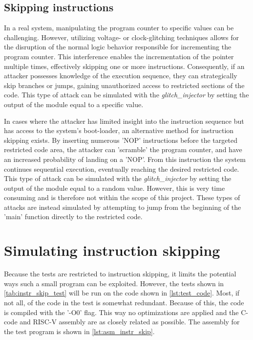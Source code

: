 \subsection{Skipping instructions}
\label{subsec:skip_instr}

In a real system, manipulating the program counter to specific values can be challenging. However, utilizing voltage- or clock-glitching techniques allows for the disruption of the normal logic behavior responsible for incrementing the program counter. This interference enables the incrementation of the pointer multiple times, effectively skipping one or more instructions. Consequently, if an attacker possesses knowledge of the execution sequence, they can strategically skip branches or jumps, gaining unauthorized access to restricted sections of the code. This type of attack can be simulated with the \textit{glitch\_injector} by setting the output of the module equal to a specific value. 

In cases where the attacker has limited insight into the instruction sequence but has access to the system's boot-loader, an alternative method for instruction skipping exists. By inserting numerous 'NOP' instructions before the targeted restricted code area, the attacker can 'scramble' the program counter, and have an increased probability of landing on a 'NOP'. From this instruction the system continues sequential execution, eventually reaching the desired restricted code. This type of attack can be simulated with the \textit{glitch\_injector} by setting the output of the module equal to a random value. However, this is very time consuming and is therefore not within the scope of this project. These types of attacks are instead simulated by attempting to jump from the beginning of the 'main' function directly to the restricted code. 

\section{Simulating instruction skipping}
\label{sec:sim_instr_skip}

Because the tests are restricted to instruction skipping, it limits the potential ways such a small program can be exploited. However, the tests shown in \autoref{tab:instr_skip_test} will be run on the code shown in \autoref{lst:test_code}. Most, if not all, of the code in the test is somewhat redundant. Because of this, the code is compiled with the '-O0' flag. This way no optimizations are applied and the C-code and RISC-V assembly are as closely related as possible. The assembly for the test program is shown in \autoref{lst:asm_instr_skip}. 

